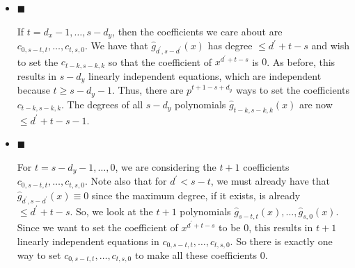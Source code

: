 \begin{itemize}
The next case is $t=s,\nobreak\ s-1,\nobreak\ \dots,\nobreak\ d_{x}$. In this case, we are looking at the $d_{x}+1$ coefficients $c_{0,s-t,t},\dots,c_{d_{x},s-t+d_{x},t-d_{x}}$. We have so far that all $\hat{g}_{d^{\prime},s-d^{\prime}}(x)$ have degree $\leq d^{\prime}+t-s$, and the coefficient of $x^{d^{\prime}+t-s}$ in $\hat{g}_{d^{\prime},s-d^{\prime}}(x)$ is equal to the sum of the coefficients of $x^{d^{\prime}+t-s}$ and $x^{d^{\prime}+t-s+(p-1)}$ in $g_{d^{\prime},s-d^{\prime}}(x)$. Similar to the previous case, this results in $s-d_{y}$ independent linear equations (by Lemma 33, using the fact that $t\geq s-d_{y}-1$. Thus, there are $p^{d_{x}+d_{y}+1-s}$ ways to set $c_{0,s-t,t},\dots,c_{d_{x},s-t+d_{x},t-d_{x}}$. Note that after we’ve set these coefficients, the degree of $\hat{g}_{d^{\prime},s-d^{\prime}}(x)$ necessarily must be $\leq d^{\prime}+t-s-1$ by choice of these coefficients.\par





\item[] 
$\blacksquare$ 


If $t=d_{x}-1,\dots,s-d_{y}$, then the coefficients we care about are $c_{0,s-t,t},\dots,c_{t,s,0}$. We have that $\hat{g}_{d^{\prime},s-d^{\prime}}(x)$ has degree $\leq d^{\prime}+t-s$ and wish to set the $c_{t-k,s-k,k}$ so that the coefficient of $x^{d^{\prime}+t-s}$ is $0$. As before, this results in $s-d_{y}$ linearly independent equations, which are independent because $t\geq s-d_{y}-1$. Thus, there are $p^{t+1-s+d_{y}}$ ways to set the coefficients $c_{t-k,s-k,k}$. The degrees of all $s-d_{y}$ polynomials $\hat{g}_{t-k,s-k,k}(x)$ are now $\leq d^{\prime}+t-s-1$.\par





\item[] 
$\blacksquare$ 


For $t=s-d_{y}-1,\dots,0$, we are considering the $t+1$ coefficients $c_{0,s-t,t},\dots,c_{t,s,0}$. Note also that for $d^{\prime}<s-t$, we must already have that $\hat{g}_{d^{\prime},s-d^{\prime}}(x)\equiv 0$ since the maximum degree, if it exists, is already $\leq d^{\prime}+t-s$. So, we look at the $t+1$ polynomials $\hat{g}_{s-t,t}(x),\dots,\hat{g}_{s,0}(x)$. Since we want to set the coefficient of $x^{d^{\prime}+t-s}$ to be $0$, this results in $t+1$ linearly independent equations in $c_{0,s-t,t},\dots,c_{t,s,0}$. So there is exactly one way to set $c_{0,s-t,t},\dots,c_{t,s,0}$ to make all these coefficients $0$.\par





\end{itemize}





